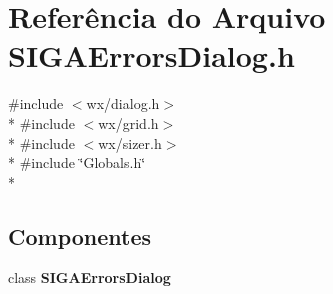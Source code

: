\section{Referência do Arquivo S\+I\+G\+A\+Errors\+Dialog.\+h}
\label{_s_i_g_a_errors_dialog_8h}
{\ttfamily \#include $<$wx/dialog.\+h$>$}\\*
{\ttfamily \#include $<$wx/grid.\+h$>$}\\*
{\ttfamily \#include $<$wx/sizer.\+h$>$}\\*
{\ttfamily \#include \char`\"{}Globals.\+h\char`\"{}}\\*
\subsection*{Componentes}
\begin{DoxyCompactItemize}
\item 
class {\bf S\+I\+G\+A\+Errors\+Dialog}
\end{DoxyCompactItemize}
